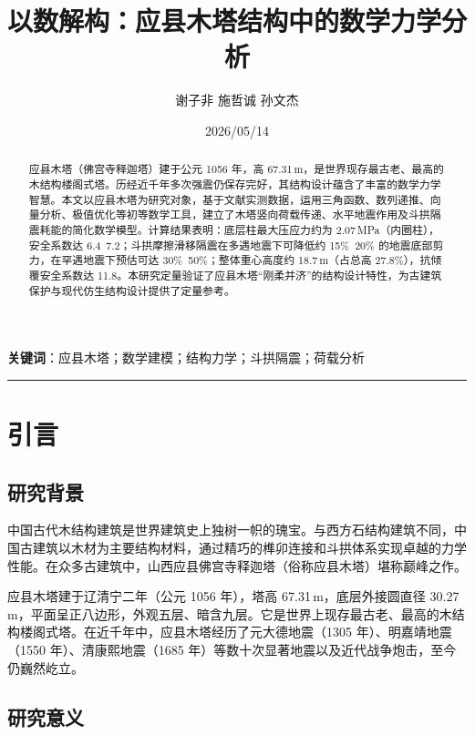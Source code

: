 \documentclass[12pt,a4paper,UTF8]{ctexart}
\title{\textbf{以数解构：应县木塔结构中的数学力学分析}}
\author{谢子非 \quad 施哲诚 \quad 孙文杰}
\date{2026/05/14}
\begin{document}
\maketitle
\thispagestyle{empty}

\begin{abstract}
    应县木塔（佛宫寺释迦塔）建于公元 1056 年，高 67.31\,m，是世界现存最古老、最高的木结构楼阁式塔。历经近千年多次强震仍保存完好，其结构设计蕴含了丰富的数学力学智慧。本文以应县木塔为研究对象，基于文献实测数据，运用三角函数、数列递推、向量分析、极值优化等初等数学工具，建立了木塔竖向荷载传递、水平地震作用及斗拱隔震耗能的简化数学模型。计算结果表明：底层柱最大压应力约为 2.07\,MPa（内圈柱），安全系数达 6.4~7.2；斗拱摩擦滑移隔震在多遇地震下可降低约 15\%~20\% 的地震底部剪力，在罕遇地震下预估可达 30\%~50\%；整体重心高度约 18.7\,m（占总高 27.8\%），抗倾覆安全系数达 11.8。本研究定量验证了应县木塔“刚柔并济”的结构设计特性，为古建筑保护与现代仿生结构设计提供了定量参考。
\end{abstract}

\noindent\textbf{关键词}：应县木塔；数学建模；结构力学；斗拱隔震；荷载分析

\vspace{1em}
\hrule
\vspace{1em}

\section{引言}
\label{sec:intro}

\subsection{研究背景}

中国古代木结构建筑是世界建筑史上独树一帜的瑰宝。与西方石结构建筑不同，中国古建筑以木材为主要结构材料，通过精巧的榫卯连接和斗拱体系实现卓越的力学性能。在众多古建筑中，山西应县佛宫寺释迦塔（俗称应县木塔）堪称巅峰之作。

应县木塔建于辽清宁二年（公元 1056 年），塔高 67.31\,m，底层外接圆直径 30.27\,m，平面呈正八边形，外观五层、暗含九层。它是世界上现存最古老、最高的木结构楼阁式塔。在近千年中，应县木塔经历了元大德地震（1305 年）、明嘉靖地震（1550 年）、清康熙地震（1685 年）等数十次显著地震以及近代战争炮击，至今仍巍然屹立。

\subsection{研究意义}
\end{document}
